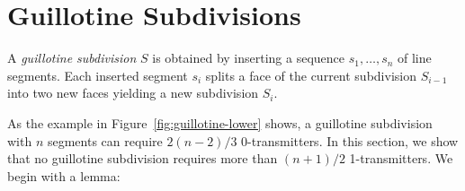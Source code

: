 \documentclass{article}
\newtheorem{lem}{Lemma}
\begin{document}
%
%
%
%
%
%
%


\section*{Guillotine Subdivisions}
A \emph{guillotine subdivision} $S$ is obtained by inserting a sequence
$s_1,\ldots,s_n$ of line segments.  Each inserted segment $s_i$ splits
a face of the current subdivision $S_{i-1}$ into two new faces yielding
a new subdivision $S_i$.

As the example in Figure~\ref{fig:guillotine-lower} shows, a guillotine
subdivision with $n$ segments can require $2(n-2)/3$ 0-transmitters.
In this section, we show that no guillotine subdivision requires more
than $(n+1)/2$ 1-transmitters.  We begin with a lemma:
\end{document}
